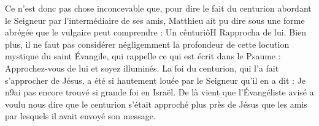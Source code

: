 Ce n’est donc pas chose inconcevable que, pour dire le fait du centurion abordant le Seigneur par l’intermédiaire de ses amis, Matthieu ait pu dire sous une forme abrégée que le vulgaire peut comprendre : Un cênturiôH Rapprocha de lui. Bien plus, il ne faut pas considérer négligemment la profondeur de cette locution mystique du saint Évangile, qui rappelle ce qui est écrit dans le Psaume : Approchez-vous de lui et soyez illuminés. La foi du centurion, qui l’a fait s’approcher de Jésus, a été si hautement louée par le Seigneur qu’il en a dit : Je n9ai pas encore trouvé si grande foi en Israël. De là vient que l’Évangéliste avisé a voulu nous dire que le centurion s’était approché plus près de Jésus que les amis par lesquels il avait envoyé son message.
